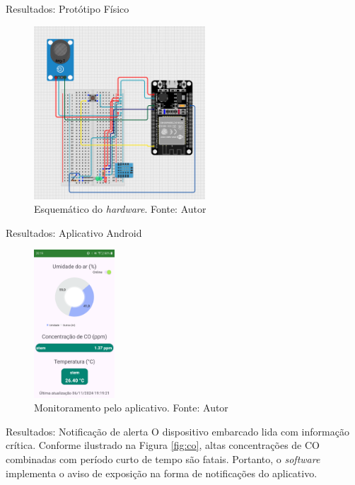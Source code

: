 \documentclass[12pt]{beamer}
\begin{document}
    \begin{frame}{Resultados: Protótipo Físico}
        \begin{figure}[ht]
            \centering
            \includegraphics[width=0.57\textwidth]{img/buri-esquematico.png}
            \caption{Esquemático do \textit{hardware}. Fonte: Autor}\label{fig:hardware}
        \end{figure}
    \end{frame}

    \begin{frame}{Resultados: Aplicativo Android}
        \begin{figure}[ht]
            \centering
            \includegraphics[width=0.27\textwidth]{img/app.png}
            \caption{Monitoramento pelo aplicativo. Fonte: Autor}\label{fig:software}
        \end{figure}
    \end{frame}

    \begin{frame}{Resultados: Notificação de alerta}
        O dispositivo embarcado lida com informação crítica. Conforme ilustrado na Figura \ref{fig:co}, 
        altas concentrações de CO combinadas com período curto de tempo são fatais. Portanto, o \textit{software} 
        implementa o aviso de exposição na forma de notificações do aplicativo.
    \end{frame}
\end{document}
